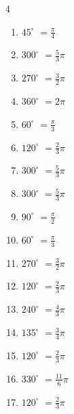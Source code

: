 \begin{multicols}{4}
\begin{enumerate}
  \item $\displaystyle 45^{\circ}$
        $\displaystyle =\frac{\pi}{4}$

  \item $\displaystyle 300^{\circ}$
        $\displaystyle =\frac{5}{3}\pi$

  \item $\displaystyle 270^{\circ}$
        $\displaystyle =\frac{3}{2}\pi$

  \item $\displaystyle 360^{\circ}$
        $\displaystyle =2\pi$

  \item $\displaystyle 60^{\circ}$
        $\displaystyle =\frac{\pi}{3}$

  \item $\displaystyle 120^{\circ}$
        $\displaystyle =\frac{2}{3}\pi$

  \item $\displaystyle 300^{\circ}$
        $\displaystyle =\frac{5}{3}\pi$

  \item $\displaystyle 300^{\circ}$
        $\displaystyle =\frac{5}{3}\pi$

  \item $\displaystyle 90^{\circ}$
        $\displaystyle =\frac{\pi}{2}$

  \item $\displaystyle 60^{\circ}$
        $\displaystyle =\frac{\pi}{3}$

  \item $\displaystyle 270^{\circ}$
        $\displaystyle =\frac{3}{2}\pi$

  \item $\displaystyle 120^{\circ}$
        $\displaystyle =\frac{2}{3}\pi$

  \item $\displaystyle 240^{\circ}$
        $\displaystyle =\frac{4}{3}\pi$

  \item $\displaystyle 135^{\circ}$
        $\displaystyle =\frac{3}{4}\pi$

  \item $\displaystyle 120^{\circ}$
        $\displaystyle =\frac{2}{3}\pi$

  \item $\displaystyle 330^{\circ}$
        $\displaystyle =\frac{11}{6}\pi$

  \item $\displaystyle 120^{\circ}$
        $\displaystyle =\frac{2}{3}\pi$


\end{enumerate}
\end{multicols}
